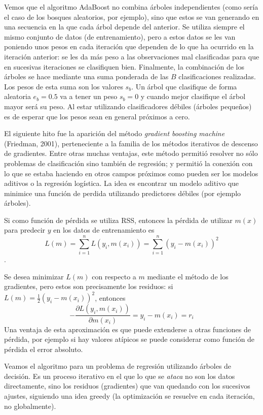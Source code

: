 \documentclass[]{book}
\theoremstyle{break}
\theoremstyle{definition}
\theoremstyle{definition}
\theoremstyle{definition}
\theoremstyle{remark}
\begin{document}
Vemos que el algoritmo AdaBoost no combina árboles independientes (como
sería el caso de los bosques aleatorios, por ejemplo), sino que estos se
van generando en una secuencia en la que cada árbol depende del
anterior. Se utiliza siempre el mismo conjunto de datos (de
entrenamiento), pero a estos datos se les van poniendo unos pesos en
cada iteración que dependen de lo que ha ocurrido en la iteración
anterior: se les da más peso a las observaciones mal clasificadas para
que en sucesivas iteraciones se clasifiquen bien. Finalmente, la
combinación de los árboles se hace mediante una suma ponderada de las
\(B\) clasificaciones realizadas. Los pesos de esta suma son los valores
\(s_b\). Un árbol que clasifique de forma aleatoria \(e_b = 0.5\) va a
tener un peso \(s_b = 0\) y cuando mejor clasifique el árbol mayor será
su peso. Al estar utilizando clasificadores débiles (árboles pequeños)
es de esperar que los pesos sean en general próximos a cero.

El siguiente hito fue la aparición del método \emph{gradient boosting
machine} (Friedman, 2001), perteneciente a la familia de los métodos
iterativos de descenso de gradientes. Entre otras muchas ventajas, este
método permitió resolver no sólo problemas de clasificación sino también
de regresión; y permitió la conexión con lo que se estaba haciendo en
otros campos próximos como pueden ser los modelos aditivos o la
regresión logística. La idea es encontrar un modelo aditivo que minimice
una función de perdida utilizando predictores débiles (por ejemplo
árboles).

Si como función de pérdida se utiliza RSS, entonces la pérdida de
utilizar \(m(x)\) para predecir \(y\) en los datos de entrenamiento es
\[L(m) = \sum_{i=1}^n L(y_i, m(x_i)) = \sum_{i=1}^n (y_i - m(x_i))^2\].

Se desea minimizar \(L(m)\) con respecto a \(m\) mediante el método de
los gradientes, pero estos son precisamente los residuos: si
\(L(m)= \frac{1}{2} (y_i - m(x_i))^2\), entonces
\[- \frac{\partial L(y_i, m(x_i))} {\partial m(x_i)} = y_i - m(x_i) = r_i\]
Una ventaja de esta aproximación es que puede extenderse a otras
funciones de pérdida, por ejemplo si hay valores atípicos se puede
considerar como función de pérdida el error absoluto.

Veamos el algoritmo para un problema de regresión utilizando árboles de
decisión. Es un proceso iterativo en el que lo que se \emph{ataca} no
son los datos directamente, sino los residuos (gradientes) que van
quedando con los sucesivos ajustes, siguiendo una idea greedy (la
optimización se resuelve en cada iteración, no globalmente).
\end{document}
